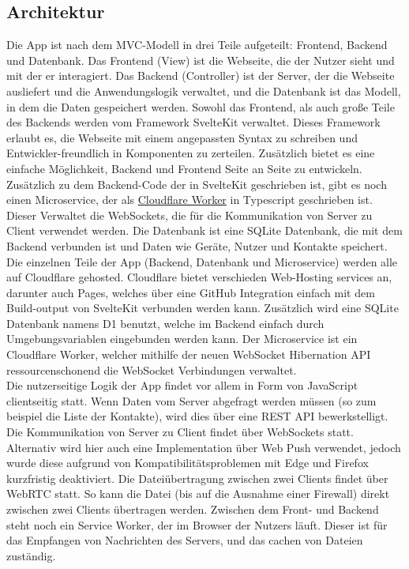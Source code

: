 \documentclass[a4paper]{article}
\begin{document}
\subsection{Architektur}
Die App ist nach dem MVC-Modell in drei Teile aufgeteilt: Frontend, Backend und
Datenbank. Das Frontend (View) ist die Webseite, die der Nutzer sieht und mit
der er interagiert. Das Backend (Controller) ist der Server, der die Webseite
ausliefert und die Anwendungslogik verwaltet, und die Datenbank ist das Modell,
in dem die Daten gespeichert werden. Sowohl das Frontend, als auch große Teile
des Backends werden vom Framework SvelteKit verwaltet. Dieses Framework erlaubt
es, die Webseite mit einem angepassten Syntax zu schreiben und
Entwickler-freundlich in Komponenten zu zerteilen. Zusätzlich bietet es eine
einfache Möglichkeit, Backend und Frontend Seite an Seite zu entwickeln.
Zusätzlich zu dem Backend-Code der in SvelteKit geschrieben ist, gibt es noch
einen Microservice, der als \href{https://workers.cloudflare.com/}{Cloudflare
  Worker} in Typescript geschrieben ist. Dieser Verwaltet die WebSockets, die für
die Kommunikation von Server zu Client verwendet werden. Die Datenbank ist eine
SQLite Datenbank, die mit dem Backend verbunden ist und Daten wie Geräte, Nutzer
und Kontakte speichert.\\
Die einzelnen Teile der App (Backend, Datenbank und Microservice) werden alle
auf Cloudflare gehosted. Cloudflare bietet verschieden Web-Hosting services an,
darunter auch Pages, welches über eine GitHub Integration einfach mit dem
Build-output von SvelteKit verbunden werden kann. Zusätzlich wird eine SQLite
Datenbank namens D1 benutzt, welche im Backend einfach durch Umgebungsvariablen
eingebunden werden kann. Der Microservice ist ein Cloudflare Worker, welcher
mithilfe der neuen WebSocket Hibernation API ressourcenschonend die WebSocket
Verbindungen verwaltet.\\
Die nutzerseitige Logik der App findet vor allem in Form von JavaScript
clientseitig statt. Wenn Daten vom Server abgefragt werden müssen (so zum
beispiel die Liste der Kontakte), wird dies über eine REST API bewerkstelligt.
Die Kommunikation von Server zu Client findet über WebSockets statt. Alternativ
wird hier auch eine Implementation über Web Push verwendet, jedoch wurde diese
aufgrund von Kompatibilitätsproblemen mit Edge und Firefox kurzfristig
deaktiviert. Die Dateiübertragung zwischen zwei Clients findet über WebRTC
statt. So kann die Datei (bis auf die Ausnahme einer Firewall) direkt zwischen
zwei Clients übertragen werden. Zwischen dem Front- und Backend steht noch ein
Service Worker, der im Browser der Nutzers läuft. Dieser ist für das Empfangen
von Nachrichten des Servers, und das cachen von Dateien zuständig.
\end{document}
